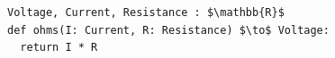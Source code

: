 \documentclass[border=10pt]{standalone}
\begin{document}
\begin{lstlisting}
Voltage, Current, Resistance : $\mathbb{R}$
def ohms(I: Current, R: Resistance) $\to$ Voltage:
  return I * R
\end{lstlisting}
\end{document}
